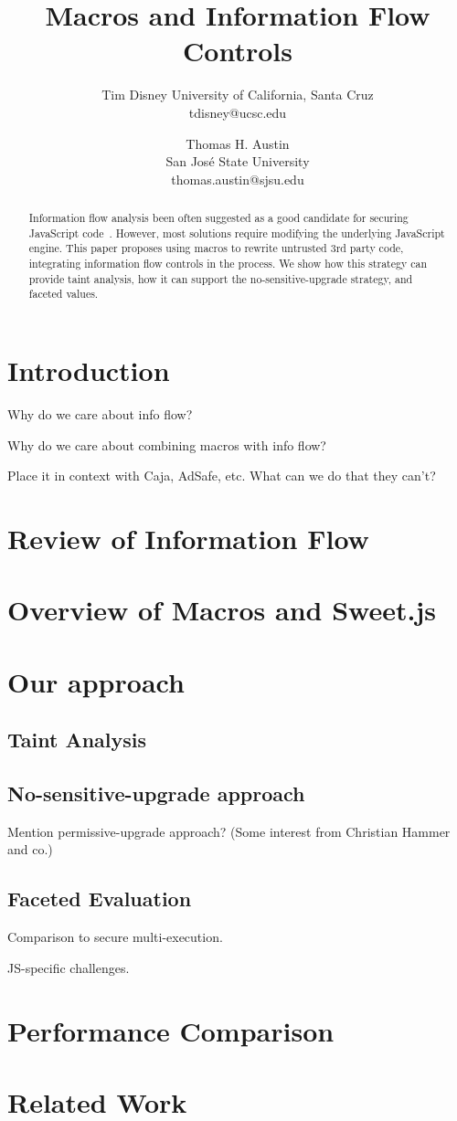 \documentclass{article}
\title{Macros and Information Flow Controls}
\author{
  Tim Disney
  University of California, Santa Cruz \\
  tdisney@ucsc.edu
  \and
  Thomas H. Austin \\
  San Jos\'{e} State University \\
  thomas.austin@sjsu.edu
  }
\begin{document}
\maketitle

\begin{abstract}
Information flow analysis been often suggested as a
good candidate for securing JavaScript code~\cite{aaa}.
However, most solutions require modifying the underlying JavaScript engine.
This paper proposes using macros to rewrite untrusted 3rd party code,
integrating information flow controls in the process.
We show how this strategy can provide taint analysis,
how it can support the no-sensitive-upgrade strategy,
and faceted values.
\end{abstract}

\section{Introduction}

Why do we care about info flow?

Why do we care about combining macros with info flow?

Place it in context with Caja, AdSafe, etc.
What can we do that they can't?


\section{Review of Information Flow}

\section{Overview of Macros and Sweet.js}

\section{Our approach}

\subsection{Taint Analysis}

\subsection{No-sensitive-upgrade approach}

Mention permissive-upgrade approach?
(Some interest from Christian Hammer and co.)

\subsection{Faceted Evaluation}

Comparison to secure multi-execution.

JS-specific challenges.

\section{Performance Comparison}

\section{Related Work}






\end{document}
